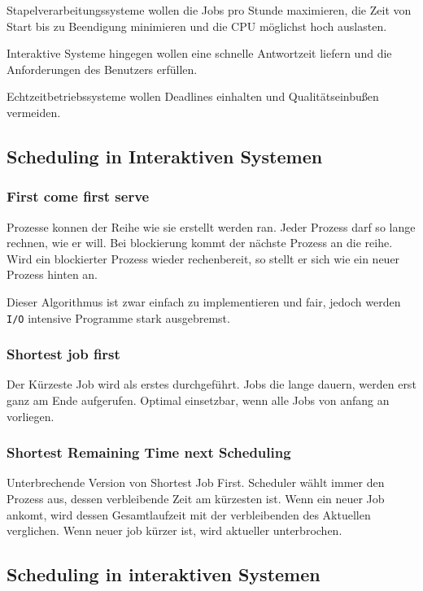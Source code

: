 Stapelverarbeitungssysteme wollen die Jobs pro Stunde maximieren, die Zeit von
Start bis zu Beendigung minimieren und die CPU möglichst hoch auslasten.

Interaktive Systeme hingegen wollen eine schnelle Antwortzeit liefern und die
Anforderungen des Benutzers erfüllen.

Echtzeitbetriebssysteme wollen Deadlines einhalten und Qualitätseinbußen
vermeiden.

\subsection{Scheduling in Interaktiven Systemen}
\subsubsection{First come first serve}

Prozesse konnen der Reihe wie sie erstellt werden ran. Jeder Prozess darf so
lange rechnen, wie er will. Bei blockierung kommt der nächste Prozess an die
reihe. Wird ein blockierter Prozess wieder rechenbereit, so stellt er sich wie
ein neuer Prozess hinten an.

Dieser Algorithmus ist zwar einfach zu implementieren und fair, jedoch werden
\texttt{I/O} intensive Programme stark ausgebremst.

\subsubsection{Shortest job first}

Der Kürzeste Job wird als erstes durchgeführt. Jobs die lange dauern, werden
erst ganz am Ende aufgerufen. Optimal einsetzbar, wenn alle Jobs von anfang an
vorliegen.

\subsubsection{Shortest Remaining Time next Scheduling}

Unterbrechende Version von Shortest Job First. Scheduler wählt immer den
Prozess aus, dessen verbleibende Zeit am kürzesten ist. Wenn ein neuer Job
ankomt, wird dessen Gesamtlaufzeit mit der verbleibenden des Aktuellen
verglichen. Wenn neuer job kürzer ist, wird aktueller unterbrochen.

\subsection{Scheduling in interaktiven Systemen}

